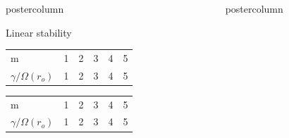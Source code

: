 \documentclass[final,hyperref={pdfpagelabels=false}]{beamer}
\newlength{\columnheight}
\begin{document}
\begin{frame}
\begin{columns}
\begin{column}{.49\textwidth}
\begin{beamercolorbox}[center,wd=\textwidth]{postercolumn}
\begin{minipage}[T]{.95\textwidth}
{\begin{block}{{\Large Linear stability}}
                   \begin{table}
                     \hfill
                     \begin{minipage}{0.45\textwidth}
                       \begin{tabularx}{\textwidth}{l*{5}{R}} \toprule \addlinespace[10pt]
                          \\ \midrule
                         m                    & 1 & 2 & 3 & 4 & 5  \\ 
                         $\gamma/\Omega(r_o)$ & 1 & 2 & 3 & 4 & 5   \\ \bottomrule
                       \end{tabularx}
                     \end{minipage}
                     \hfill
                     \begin{minipage}{0.45\textwidth}
                       \begin{tabularx}{\textwidth}{l*{5}{R}} \toprule \addlinespace[10pt]
                          \\ \midrule
                         m                    & 1 & 2 & 3 & 4 & 5  \\ 
                         $\gamma/\Omega(r_o)$ & 1 & 2 & 3 & 4 & 5   \\ \bottomrule
                       \end{tabularx}
                     \end{minipage}
                     \hfill
                   \end{table}

                  
            \end{block}
            \vfill
          }
        \end{minipage}
      \end{beamercolorbox}
    \end{column}
    
    \begin{column}{.49\textwidth}
      \begin{beamercolorbox}[center,wd=\textwidth]{postercolumn}
        \begin{minipage}[T]{.95\textwidth} %
          \parbox[t][\columnheight]{\textwidth}{ %
            
}
\end{minipage}
\end{beamercolorbox}
\end{column}
\end{columns}
\end{frame}
\end{document}

